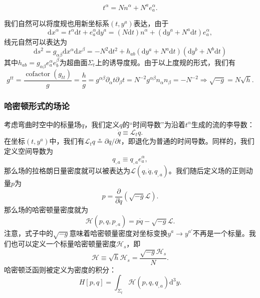 \documentclass[hyperref, UTF8, a4paper]{ctexart}
\begin{document}
\begin{equation*}
	t^{\alpha } =Nn^{\alpha } +N^{a} e_{a}^{\alpha } .
\end{equation*}

我们自然可以将度规也用新坐标系$(t,y^{a} )$表达，由于
\begin{equation*}
	\mathrm{d} x^{\alpha } =t^{\alpha }\mathrm{d} t+e_{a}^{\alpha }\mathrm{d} y^{a} =(N\mathrm{d} t)n^{\alpha } +(\mathrm{d} y^{a} +N^{a}\mathrm{d} t)e_{a}^{\alpha } ,
\end{equation*}
线元自然可以表达为
\begin{equation*}
	\mathrm{d} s^{2} =g_{\alpha \beta }\mathrm{d} x^{\alpha }\mathrm{d} x^{\beta } =-N^{2}\mathrm{d} t^{2} +h_{ab} (\mathrm{d} y^{a} +N^{a}\mathrm{d} t)(\mathrm{d} y^{b} +N^{b}\mathrm{d} t)
\end{equation*}
其中$h_{ab} =g_{\alpha \beta } e_{a}^{\alpha } e_{b}^{\beta }$为超曲面$\Sigma _{t}$上的诱导度规。由于以上度规的形式，我们有
\begin{equation*}
	g^{tt} =\frac{\operatorname{cofactor}( g_{tt})}{g} =\frac{h}{g} =g^{\alpha \beta } \partial _{\alpha } t\partial _{\beta } t=N^{-2} g^{\alpha \beta } n_{\alpha } n_{\beta } =-N^{-2} \Rightarrow \boxed{\sqrt{-g} =N\sqrt{h}} .
\end{equation*}
\subsubsection{哈密顿形式的场论}

考虑弯曲时空中的标量场$q$，我们定义$q$的“时间导数”为沿着$t^{\alpha }$生成的流的李导数：
\begin{equation*}
	\dot{q} \equiv \mathcal{L}_{t} q.
\end{equation*}
在坐标$(t,y^{a} )$中，我们有$\mathcal{L}_{t} q\stackrel{*}{=} \partial q/\partial t$，即退化为普通的时间导数。同样的，我们定义空间导数为
\begin{equation*}
	q_{,a} \equiv q_{,a} e_{a}^{\alpha } ,
\end{equation*}
那么场的拉格朗日量密度就可以被表达为$\mathcal{L} (q,\dot{q} ,q_{,a} )$。我们随后定义场的正则动量$p$为
\begin{equation*}
	p=\frac{\partial }{\partial \dot{q}}\left(\sqrt{-g}\mathcal{L}\right) .
\end{equation*}
那么场的哈密顿量密度就为
\begin{equation*}
	\mathcal{H} (p,q,p_{,a} )=p\dot{q} -\sqrt{-g}\mathcal{L} .
\end{equation*}
注意，式子中的$\sqrt{-g}$意味着哈密顿量密度对坐标变换$y^{a}\rightarrow y^{a'}$不再是一个标量。我们也可以定义一个标量哈密顿量密度$\mathcal{H}_{s}$，即
\begin{equation*}
	\mathcal{H} \equiv \sqrt{h} \mathcal{H}_{s} =\frac{\sqrt{-g}\mathcal{H}_{s}}{N} .
\end{equation*}
哈密顿泛函则被定义为密度的积分：
\begin{equation*}
	H[ p,q] =\int _{\Sigma _{t}}\mathcal{H} (p,q,q_{,a} )\mathrm{d}^{3} y.
\end{equation*}
\end{document}
